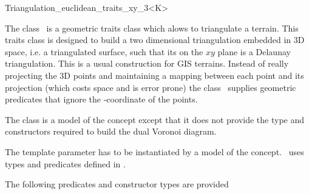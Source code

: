 

\begin{ccRefClass}{Triangulation_euclidean_traits_xy_3<K>}  %

\ccDefinition
  
The class \ccRefName\ is a geometric traits class which alows to
triangulate
a terrain. This traits class is designed to build 
a two dimensional triangulation  embedded in 3D space,
i.e. a triangulated surface, such that 
its
on the $xy$ plane  is a Delaunay triangulation.
This is a usual construction for GIS terrains.
Instead of really projecting the 3D points and
maintaining a mapping between each point and its projection
 (which costs space and is error prone)
the class \ccRefName\  supplies geometric predicates that ignore the
-coordinate of the points.

The class is a model of the concept  
except that it does not provide the type and constructors
required to build the dual Voronoi diagram.

\ccParameters
The template parameter   has to
be instantiated by a model of the  concept.
\ccRefName\ uses types 
and predicates defined in .


\ccTypes
{}
\ccGlue
{}
\ccGlue
{}

The following predicates and constructor types are provided


\end{ccRefClass}
